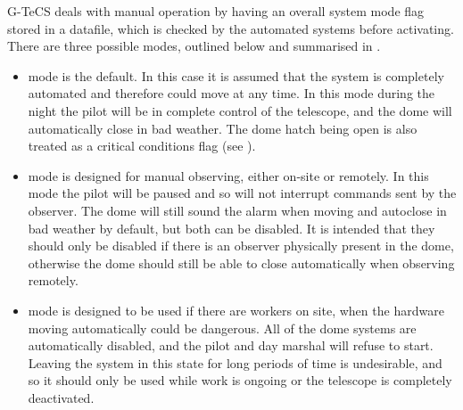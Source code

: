 \begin{colsection}
G-TeCS deals with manual operation by having an overall system mode flag stored in a datafile, which is checked by the automated systems before activating. There are three possible modes, outlined below and summarised in .

\begin{itemize}
    \item {} mode is the default. In this case it is assumed that the system is completely automated and therefore could move at any time. In this mode during the night the pilot will be in complete control of the telescope, and the dome will automatically close in bad weather. The dome hatch being open is also treated as a critical conditions flag (see ).

    \item {} mode is designed for manual observing, either on-site or remotely. In this mode the pilot will be paused and so will not interrupt commands sent by the observer. The dome will still sound the alarm when moving and autoclose in bad weather by default, but both can be disabled. It is intended that they should only be disabled if there is an observer physically present in the dome, otherwise the dome should still be able to close automatically when observing remotely.

    \item {} mode is designed to be used if there are workers on site, when the hardware moving automatically could be dangerous. All of the dome systems are automatically disabled, and the pilot and day marshal will refuse to start. Leaving the system in this state for long periods of time is undesirable, and so it should only be used while work is ongoing or the telescope is completely deactivated.
\end{itemize}

\newpage

\end{colsection}


